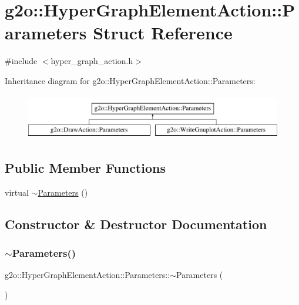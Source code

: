 \hypertarget{structg2o_1_1_hyper_graph_element_action_1_1_parameters}{}\section{g2o\+:\+:Hyper\+Graph\+Element\+Action\+:\+:Parameters Struct Reference}
\label{structg2o_1_1_hyper_graph_element_action_1_1_parameters}


{\ttfamily \#include $<$hyper\+\_\+graph\+\_\+action.\+h$>$}

Inheritance diagram for g2o\+:\+:Hyper\+Graph\+Element\+Action\+:\+:Parameters\+:\begin{figure}[H]
\begin{center}
\leavevmode
\includegraphics[height=2.000000cm]{structg2o_1_1_hyper_graph_element_action_1_1_parameters}
\end{center}
\end{figure}
\subsection*{Public Member Functions}
\begin{DoxyCompactItemize}
\item 
virtual \mbox{\hyperlink{structg2o_1_1_hyper_graph_element_action_1_1_parameters_a7ccfab1c7db5a54ac582ac8791cb7f2d}{$\sim$\+Parameters}} ()
\end{DoxyCompactItemize}


\subsection{Constructor \& Destructor Documentation}
\mbox{\label{structg2o_1_1_hyper_graph_element_action_1_1_parameters_a7ccfab1c7db5a54ac582ac8791cb7f2d}} 
\subsubsection{\texorpdfstring{$\sim$\+Parameters()}{~Parameters()}}
{\footnotesize\ttfamily g2o\+::\+Hyper\+Graph\+Element\+Action\+::\+Parameters\+::$\sim$\+Parameters (\begin{DoxyParamCaption}{ }\end{DoxyParamCaption})\hspace{0.3cm}{\ttfamily [virtual]}}



